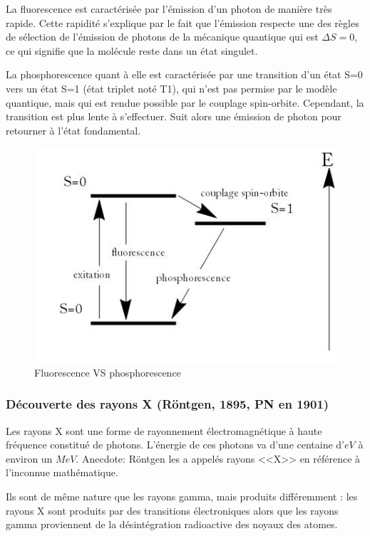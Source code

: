 La fluorescence est caractérisée par l'émission d'un photon de manière très rapide. Cette rapidité s'explique par le fait que l'émission respecte une des règles de sélection de l'émission de photons de la mécanique quantique qui est $\Delta S=0$, ce qui signifie que la molécule reste dans un état singulet.

La phosphorescence quant à elle est caractérisée par une transition d'un état S=0 vers un état S=1 (état triplet noté T1), qui n'est pas permise par le modèle quantique, mais qui est rendue possible par le couplage spin-orbite. Cependant, la transition est plus lente à s'effectuer. Suit alors une émission de photon pour retourner à l'état fondamental.

\begin{figure}[ht]
    \centering
    \includegraphics[scale=0.65]{Images1/fluophospho.jpg}
    \caption{Fluorescence VS phosphorescence}
    \label{fig:fluorescence_phosphorescence}
\end{figure}

\subsubsection{Découverte des rayons X (Röntgen, 1895, PN en 1901)}
Les rayons X sont une forme de rayonnement électromagnétique à haute fréquence constitué de photons. L'énergie de ces photons va d'une centaine d'$eV$ à environ un $\si{MeV}$. Anecdote: Röntgen les a appelés rayons <<X>> en référence à l'inconnue mathématique.

Ils sont de même nature que les rayons gamma, mais produits différemment : les rayons X sont produits par des transitions électroniques alors que les rayons gamma proviennent de la désintégration radioactive des noyaux des atomes.

